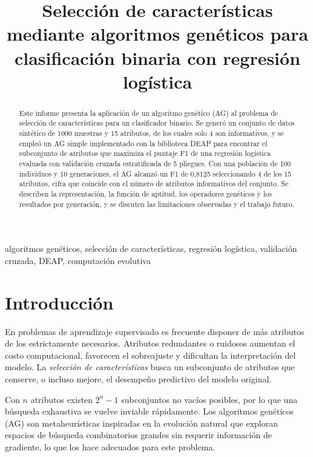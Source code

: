\documentclass[conference]{IEEEtran}
\begin{document}
\title{Selección de características mediante algoritmos genéticos para clasificación binaria con regresión logística}

\author{
}

\maketitle

\begin{abstract}
Este informe presenta la aplicación de un algoritmo genético (AG) al problema de selección de características para un clasificador binario. Se generó un conjunto de datos sintético de 1000 muestras y 15 atributos, de los cuales solo 4 son informativos, y se empleó un AG simple implementado con la biblioteca DEAP para encontrar el subconjunto de atributos que maximiza el puntaje F1 de una regresión logística evaluada con validación cruzada estratificada de 5 pliegues. Con una población de 100 individuos y 10 generaciones, el AG alcanzó un F1 de 0,8125 seleccionando 4 de los 15 atributos, cifra que coincide con el número de atributos informativos del conjunto. Se describen la representación, la función de aptitud, los operadores genéticos y los resultados por generación, y se discuten las limitaciones observadas y el trabajo futuro.
\end{abstract}

\begin{IEEEkeywords}
algoritmos genéticos, selección de características, regresión logística, validación cruzada, DEAP, computación evolutiva
\end{IEEEkeywords}

\section{Introducción}
En problemas de aprendizaje supervisado es frecuente disponer de más atributos de los estrictamente necesarios. Atributos redundantes o ruidosos aumentan el costo computacional, favorecen el sobreajuste y dificultan la interpretación del modelo. La \emph{selección de características} busca un subconjunto de atributos que conserve, o incluso mejore, el desempeño predictivo del modelo original.

Con $n$ atributos existen $2^n - 1$ subconjuntos no vacíos posibles, por lo que una búsqueda exhaustiva se vuelve inviable rápidamente. Los algoritmos genéticos (AG) \cite{holland1975,goldberg1989} son metaheurísticas inspiradas en la evolución natural que exploran espacios de búsqueda combinatorios grandes sin requerir información de gradiente, lo que los hace adecuados para este problema.
\end{document}
